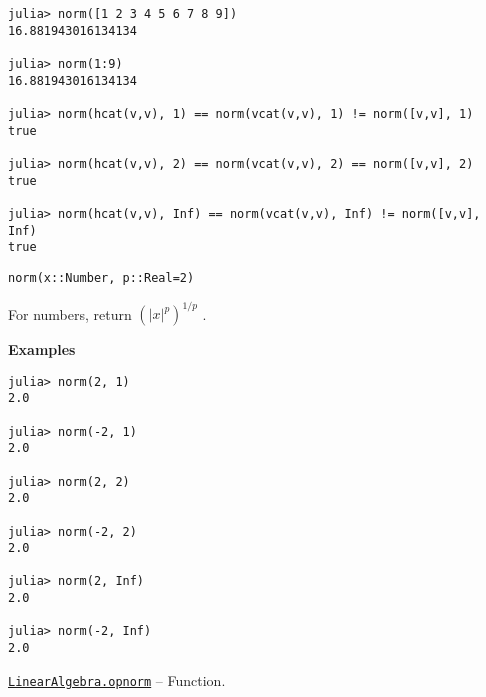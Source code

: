 \begin{adjustwidth}{2em}{0pt}
\begin{verbatim}
julia> norm([1 2 3 4 5 6 7 8 9])
16.881943016134134

julia> norm(1:9)
16.881943016134134

julia> norm(hcat(v,v), 1) == norm(vcat(v,v), 1) != norm([v,v], 1)
true

julia> norm(hcat(v,v), 2) == norm(vcat(v,v), 2) == norm([v,v], 2)
true

julia> norm(hcat(v,v), Inf) == norm(vcat(v,v), Inf) != norm([v,v], Inf)
true
\end{verbatim}




\begin{lstlisting}
norm(x::Number, p::Real=2)
\end{lstlisting}

For numbers, return  \(\left( |x|^p \right)^{1/p}\) .

\textbf{Examples}


\begin{verbatim}
julia> norm(2, 1)
2.0

julia> norm(-2, 1)
2.0

julia> norm(2, 2)
2.0

julia> norm(-2, 2)
2.0

julia> norm(2, Inf)
2.0

julia> norm(-2, Inf)
2.0
\end{verbatim}



\end{adjustwidth}
\hypertarget{4740175223212326101}{} 
\hyperlink{4740175223212326101}{\texttt{LinearAlgebra.opnorm}}  -- {Function.}

